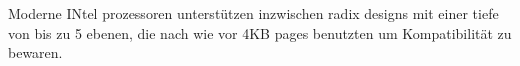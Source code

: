 Moderne INtel prozessoren unterstützen inzwischen radix designs mit einer tiefe von bis zu 5 ebenen,
die nach wie vor 4KB pages benutzten um Kompatibilität zu bewaren.





\cite{denning1970virtual} %
